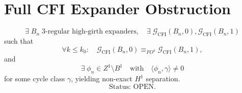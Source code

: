 \documentclass{article}
\begin{document}
\section*{Full CFI Expander Obstruction}
\[
\exists\;B_n\;\text{3-regular high-girth expanders},\quad
\exists\;\mathcal G_{\mathrm{CFI}}(B_n,0),\mathcal G_{\mathrm{CFI}}(B_n,1)
\]
such that
\[
\forall k\le k_0:\quad
\mathcal G_{\mathrm{CFI}}(B_n,0)\equiv_{FO^k}\mathcal G_{\mathrm{CFI}}(B_n,1),
\]
and
\[
\exists\;\phi_n\in Z^1\setminus B^1
\quad\text{with}\quad
\langle \phi_n,\gamma\rangle\neq 0
\]
for some cycle class \(\gamma\), yielding non-exact \(H^1\) separation.
\[
\text{Status: OPEN.}
\]
\end{document}
